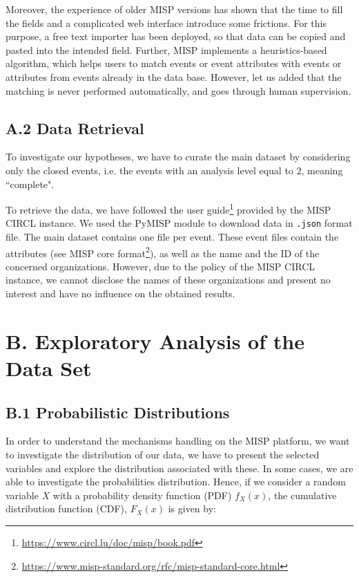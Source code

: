 \documentclass[unnumsec,webpdf,contemporary,large]{oup-authoring-template}%
\theoremstyle{thmstyleone}%
\theoremstyle{thmstyletwo}%
\theoremstyle{thmstylethree}%
\begin{document}
\begin{appendices}
Moreover, the experience of older MISP versions has shown that the time to fill the fields and a complicated web interface introduce some frictions. For this purpose, a free text importer has been deployed, so that data can be copied and pasted into the intended field. Further, MISP implements a heuristics-based algorithm, which helps users to match events or event attributes with events or attributes from events already in the data base. However, let us added that the matching is never performed automatically, and goes through human supervision.\\

   \subsection{A.2 Data Retrieval}
    To investigate our hypotheses, we have to curate the main dataset by considering only the closed events, i.e. the events with an analysis level equal to $2$, meaning ``complete".

    To retrieve the data, we have followed the user guide\footnote{\url{https://www.circl.lu/doc/misp/book.pdf}} provided by the MISP CIRCL instance. We used the PyMISP module to download data in \texttt{.json} format file. The main dataset contains one file per event. These event files contain the attributes (see MISP core format\footnote{\url{https://www.misp-standard.org/rfc/misp-standard-core.html}}), as well as the name and the ID of the concerned organizations. However, due to the policy of the MISP CIRCL instance, we cannot disclose the names of these organizations and present no interest and have no influence on the obtained results.\\
    
    
\section{B. Exploratory Analysis of the Data Set}
\label{sec:ExploA}

    \subsection{B.1 Probabilistic Distributions}
    \label{subsec:Probadist}
    In order to understand the mechanisms handling on the MISP platform, we want to investigate the distribution of our data, we have to present the selected variables and explore the distribution associated with these. In some cases, we are able to investigate the probabilities distribution. Hence, if we consider a random variable $X$ with a probability density function (PDF) $f_X(x)$, the cumulative distribution function (CDF), $F_X(x)$ is given by:
     

\end{appendices}
\end{document}
